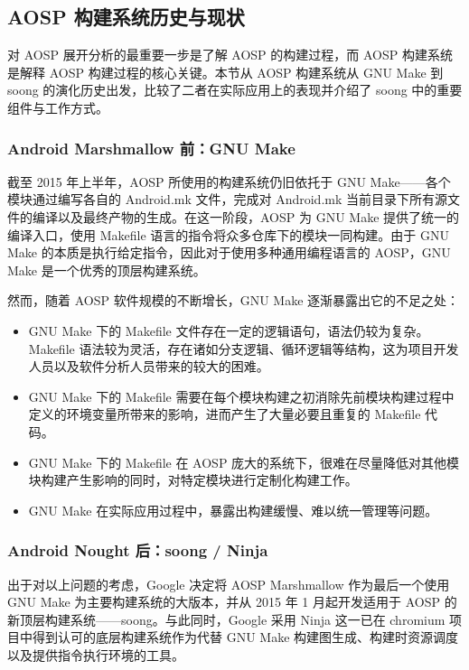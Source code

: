 \subsection{AOSP 构建系统历史与现状}

对 AOSP 展开分析的最重要一步是了解 AOSP 的构建过程，而 AOSP 构建系统是解释 AOSP 构建过程的核心关键。本节从 AOSP 构建系统从 GNU Make 到 soong 的演化历史出发，比较了二者在实际应用上的表现并介绍了 soong 中的重要组件与工作方式。

\subsubsection{Android Marshmallow 前：GNU Make}

截至 2015 年上半年，AOSP 所使用的构建系统仍旧依托于 GNU Make——各个模块通过编写各自的 Android.mk 文件，完成对 Android.mk 当前目录下所有源文件的编译以及最终产物的生成。在这一阶段，AOSP 为 GNU Make 提供了统一的编译入口，使用 Makefile 语言的指令将众多仓库下的模块一同构建。由于 GNU Make 的本质是执行给定指令，因此对于使用多种通用编程语言的 AOSP，GNU Make 是一个优秀的顶层构建系统。

然而，随着 AOSP 软件规模的不断增长，GNU Make 逐渐暴露出它的不足之处：

\begin{itemize}
    \item GNU Make 下的 Makefile 文件存在一定的逻辑语句，语法仍较为复杂。Makefile 语法较为灵活，存在诸如分支逻辑、循环逻辑等结构，这为项目开发人员以及软件分析人员带来的较大的困难。
    \item GNU Make 下的 Makefile 需要在每个模块构建之初消除先前模块构建过程中定义的环境变量所带来的影响，进而产生了大量必要且重复的 Makefile 代码。
    \item GNU Make 下的 Makefile 在 AOSP 庞大的系统下，很难在尽量降低对其他模块构建产生影响的同时，对特定模块进行定制化构建工作。
    \item GNU Make 在实际应用过程中，暴露出构建缓慢、难以统一管理等问题。
\end{itemize}

\subsubsection{Android Nought 后：soong / Ninja}

出于对以上问题的考虑，Google 决定将 AOSP Marshmallow 作为最后一个使用 GNU Make 为主要构建系统的大版本，并从 2015 年 1 月起开发适用于 AOSP 的新顶层构建系统——soong。与此同时，Google 采用 Ninja 这一已在 chromium 项目中得到认可的底层构建系统作为代替 GNU Make 构建图生成、构建时资源调度以及提供指令执行环境的工具。

